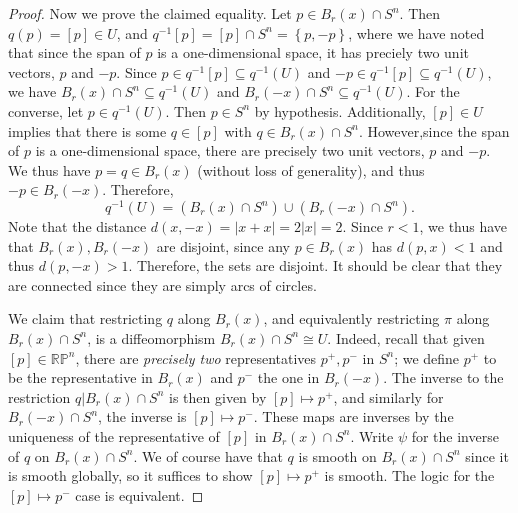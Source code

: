 \documentclass[11pt, letterpaper]{article}
\theoremstyle{plain}
\begin{document}
\begin{proof}
	Now we prove the claimed equality. Let $p\in B_r(x) \cap S^n$. Then $q(p)=[p]\in U$, and $q^{-1} [p]=[p]\cap S^n=\left\{ p,-p \right\} $, where we have noted that since the span of $p$ is a one-dimensional space, it has preciely two unit vectors, $p$ and $-p$. Since $p\in q^{-1} [p]\subseteq q^{-1} (U)$ and $-p\in q^{-1} [p]\subseteq q^{-1} (U)$, we have $B_r(x) \cap S^n \subseteq q^{-1} (U)$ and $B_r(-x) \cap S^n \subseteq q^{-1} (U)$. For the converse, let $p\in q^{-1} (U)$. Then $p\in S^n$ by hypothesis. Additionally, $[p]\in U$ implies that there is some $q\in [p]$ with $q\in B_r(x) \cap S^n$. However,since the span of $p$ is a one-dimensional space, there are precisely two unit vectors, $p$ and $-p$. We thus have $p=q\in B_r(x)$ (without loss of generality), and thus $-p\in B_r(-x)$. Therefore,
	\[
		q^{-1} (U)=(B_r(x) \cap S^n) \cup (B_r(-x)\cap S^n)
	.\]
	Note that the distance $d(x,-x)=\left| x+x \right| =2\left| x \right| =2$. Since $r<1$, we thus have that $B_r(x),B_r(-x)$ are disjoint, since any $p\in B_r(x)$ has $d(p,x)<1$ and thus $d(p,-x)>1$. Therefore, the sets are disjoint. It should be clear that they are connected since they are simply arcs of circles.

	We claim that restricting $q$ along $B_r(x)$, and equivalently restricting $\pi $ along $B_r(x)\cap S^n$, is a diffeomorphism $B_r(x) \cap S^n \cong U$. Indeed, recall that given $[p]\in\mathbb{R} \mathbb{P} ^n$, there are \emph{precisely two} representatives $p^+,p^-$ in $S^n$; we define $p^+$  to be the representative in $B_r(x)$ and $p^-$ the one in $B_r(-x)$. The inverse to the restriction $q|B_r(x) \cap S^n$ is then given by $[p]\mapsto p^+$, and similarly for $B_r(-x) \cap S^n$, the inverse is $[p]\mapsto p^-$. These maps are inverses by the uniqueness of the representative of $[p]$ in $B_r(x) \cap S^n$. Write $\psi $ for the inverse of $q$ on $B_r(x) \cap S^n$. We of course have that $q$ is smooth on $B_r(x) \cap S^n$ since it is smooth globally, so it suffices to show $[p]\mapsto p^+$ is smooth. The logic for the $[p]\mapsto p^-$ case is equivalent.


\end{proof}
\end{document}
